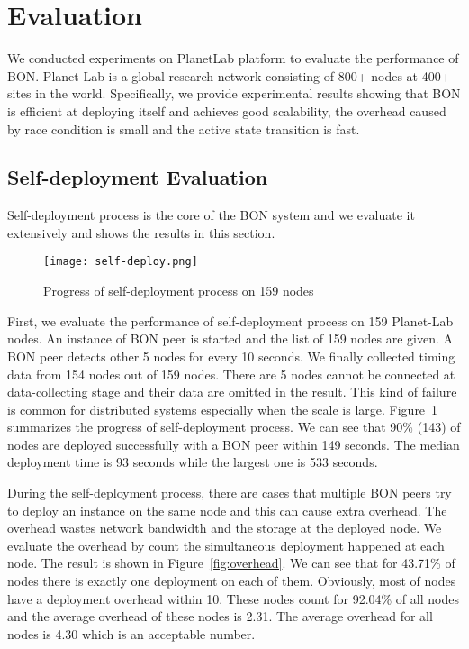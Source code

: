 \section{Evaluation}
\label{sec:eval}

We conducted experiments on PlanetLab platform to evaluate the
performance of BON. Planet-Lab is a global research network
consisting of 800+ nodes at 400+ sites in the world.
Specifically, we provide experimental results showing that BON
is efficient at deploying itself and achieves good scalability,
the overhead caused by race condition is small and the active
state transition is fast.

\subsection{Self-deployment Evaluation}

Self-deployment process is the core of the BON system and we
evaluate it extensively and shows the results in this section.

\begin{figure}
\centering
\texttt{[image: self-deploy.png]}
\caption{Progress of self-deployment process on 159
nodes}
\label{fig:self-deploy}
\end{figure}


First, we evaluate the performance of self-deployment process on
159 Planet-Lab nodes. An instance of BON peer is started and the
list of 159 nodes are given. A BON peer detects other 5 nodes
for every 10 seconds. We finally collected timing data from 154
nodes out of 159 nodes. There are 5 nodes cannot be connected at
data-collecting stage and their data are omitted in the result.
This kind of failure is common for distributed systems
especially when the scale is large. Figure~\ref{fig:self-deploy}
summarizes the progress of self-deployment process.  We can see
that 90\% (143) of nodes are deployed successfully with a BON
peer within 149 seconds. The median deployment time is 93
seconds while the largest one is 533 seconds. 


During the self-deployment process, there are cases that multiple
BON peers try to deploy an instance on the same node and this
can cause extra overhead. The overhead wastes network
bandwidth and the storage at the deployed node. We evaluate the
overhead by count the simultaneous deployment happened at each
node. The result is shown in Figure~\ref{fig:overhead}. We can
see that for 43.71\% of nodes there is exactly one deployment
on each of them. Obviously, most of nodes have a deployment
overhead within 10. These nodes count for 92.04\% of all nodes
and the average overhead of these nodes is 2.31. The average
overhead for all nodes is 4.30 which is an acceptable number. 

